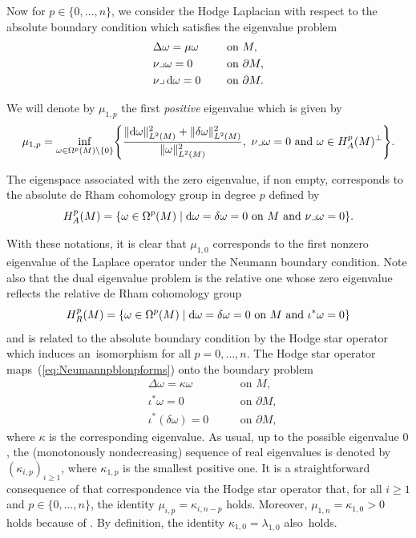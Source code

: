 \documentclass[pdftex]{sigma}
\numberwithin{equation}{section}
\theoremstyle{definition}
\begin{document}
Now for $p\in\{0,\dots,n\}$, we consider the Hodge Laplacian with respect to the absolute boundary condition which satisfies the eigenvalue problem
\begin{equation}\label{eq:Neumannpblonpforms}
\begin{aligned}
&\Delta \omega =\mu \omega\ \quad &&\textrm{on } M, \\
&\nu\lrcorner\omega =0\ \quad&&\textrm{on }\partial M, \\
&\nu\lrcorner\,{\rm d}\omega = 0\ \quad &&\textrm{on }\partial M.
\end{aligned}
\end{equation}

We will denote by $\mu_{1,p}$ the first {\it positive} eigenvalue which is given by
\begin{equation}\label{VC_Absolute}
\mu_{1,p}=\inf_{\omega\in\Omega^p(M)\setminus\{0\}}\Biggl\{\frac{\|{\rm d}\omega\|_{L^2(M)}^2+\|\delta\omega\|_{L^2(M)}^2}{\|\omega\|_{L^2(M)}^2},\ \nu\lrcorner\omega=0\textrm{ and }\omega\in H_A^p(M)^\perp\Biggr\}.
\end{equation}

The eigenspace associated with the zero eigenvalue, if non empty, corresponds to the absolute de Rham cohomology group in degree $p$ defined by
\[
H_A^p(M)= \{\omega\in \Omega^p(M)\mid {\rm d}\omega=\delta\omega=0\ \text{on}\ M\text{ and } \nu\lrcorner\omega=0 \}.
\]

With these notations, it is clear that $\mu_{1,0}$ corresponds to the first nonzero eigenvalue of the Laplace operator under the Neumann boundary condition. Note also that the dual eigenvalue problem is the relative one whose zero eigenvalue reflects the relative de Rham cohomology group
\[
 H_R^p(M)= \{\omega\in \Omega^p(M)\mid {\rm d}\omega=\delta\omega=0\ \text{on}\ M\text{ and } \iota^*\omega=0 \}
\]
and is related to the absolute boundary condition by the Hodge star operator which induces an~isomorphism  for all $p=0,\dots,n$.
The Hodge star operator maps~(\ref{eq:Neumannpblonpforms}) onto the boundary problem
\[
\begin{aligned}
&\Delta \omega =\kappa \omega\ \quad &&\textrm{on } M,\\
&\iota^*\omega =0 \ \quad &&\textrm{on }\partial M,\\
&\iota^*(\delta\omega) = 0\ \quad &&\textrm{on }\partial M,
\end{aligned}
\]
where $\kappa$ is the corresponding eigenvalue.
As usual, up to the possible eigenvalue $0$, the (mo\-no\-to\-nous\-ly nondecreasing) sequence of real eigenvalues is denoted by $(\kappa_{i,p})_{i\geq1}$, where $\kappa_{1,p}$ is the smallest positive one.
It is a straightforward consequence of that correspondence via the Hodge star operator that, for all $i\geq1$ and $p\in\{0,\dots,n\}$, the identity $\mu_{i,p}=\kappa_{i,n-p}$ holds.
Moreover, $\mu_{1,n}=\kappa_{1,0}>0$ holds because of . By definition, the identity $\kappa_{1,0}=\lambda_{1,0}$ also~holds.
\end{document}
